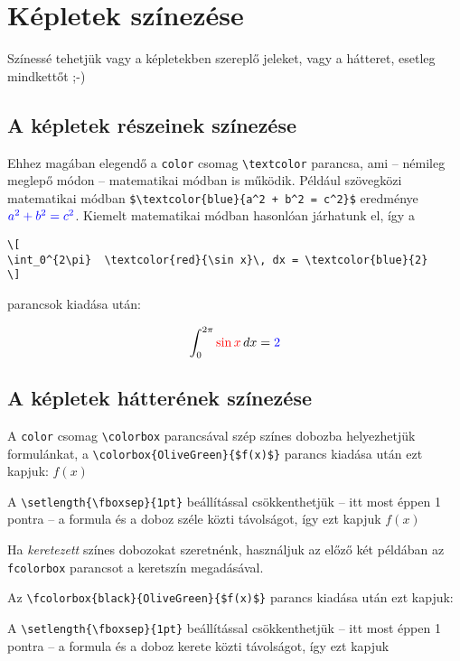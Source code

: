 \documentclass{article}
\begin{document}
\section{Képletek színezése}
Színessé tehetjük vagy a képletekben szereplő jeleket, vagy a hátteret, esetleg mindkettőt ;-)
\subsection{A képletek részeinek színezése}
Ehhez magában elegendő a  \verb!color! csomag \verb!\textcolor! parancsa, ami -- némileg meglepő módon -- matematikai módban is működik. Például szövegközi matematikai módban
\verb!$\textcolor{blue}{a^2 + b^2 = c^2}$! eredménye 
$\textcolor{blue}{a^2 + b^2 = c^2}$. Kiemelt matematikai módban hasonlóan járhatunk el, így a 
\begin{verbatim}
\[
\int_0^{2\pi}  \textcolor{red}{\sin x}\, dx = \textcolor{blue}{2}
\]
\end{verbatim}
parancsok kiadása után:

\[
\int_0^{2\pi}  \textcolor{red}{\sin x}\, dx = \textcolor{blue}{2}
\] 
\subsection{A képletek hátterének színezése}
\noindent A  \verb!color! csomag   \verb!\colorbox! parancsával szép színes dobozba helyezhetjük formulánkat, a \verb!\colorbox{OliveGreen}{$f(x)$}! parancs kiadása után ezt kapjuk:  \colorbox{OliveGreen}{$f(x)$}  \par \bigskip

\noindent A \verb!\setlength{\fboxsep}{1pt}! beállítással csökkenthetjük -- itt most éppen 1 pontra -- a formula és a doboz széle közti távolságot, így ezt kapjuk
\setlength{\fboxsep}{1pt}
\colorbox{OliveGreen}{$f(x)$} \par \bigskip
\setlength{\fboxsep}{3pt} %

\noindent Ha \emph{keretezett} színes dobozokat szeretnénk, használjuk az előző két példában az \verb!fcolorbox! parancsot a keretszín megadásával.\par \bigskip

\noindent Az \verb!\fcolorbox{black}{OliveGreen}{$f(x)$}! parancs kiadása után ezt kapjuk:    \par \bigskip

\noindent A \verb!\setlength{\fboxsep}{1pt}! beállítással csökkenthetjük -- itt most éppen 1 pontra -- a formula és a doboz kerete közti távolságot, így ezt kapjuk
\setlength{\fboxsep}{1pt}
 \par \bigskip
\setlength{\fboxsep}{3pt} %
\end{document}

